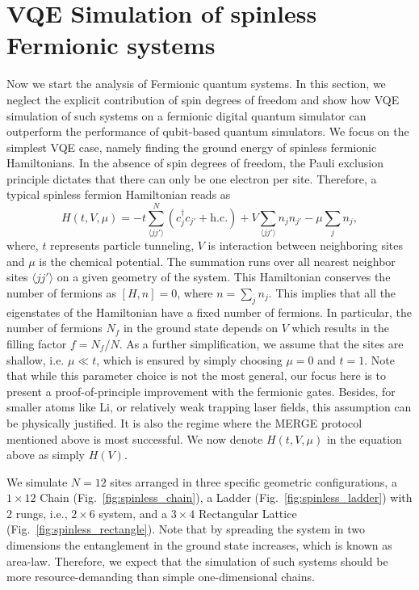 \documentclass[aps, prx, reprint, superscriptaddress]{revtex4-2}
\begin{document}
\section{VQE Simulation of spinless Fermionic systems}
\label{sec:III}
Now we start the analysis of Fermionic quantum systems. In this section, we neglect the explicit contribution of spin degrees of freedom and show how VQE simulation of such systems on a fermionic digital quantum simulator can outperform 
the performance of qubit-based quantum simulators. We focus on the simplest VQE case, namely finding the ground energy of spinless fermionic Hamiltonians. In the absence of spin degrees of freedom, the Pauli exclusion principle dictates that there can only be one electron per site. Therefore, a typical spinless fermion Hamiltonian reads as
\begin{equation}
    H(t,V,\mu)=-t\sum_{\langle jj'\rangle}^{N}(c_j^\dagger c_{j'} +\text{h.c.})+V\sum_{\langle jj'\rangle}n_jn_{j'}-\mu\sum_jn_j,
\label{eq:hubbard_spinless}
\end{equation}
where, $t$ represents particle tunneling, $V$ is interaction between neighboring sites and $\mu$ is the chemical potential. The summation runs over all nearest neighbor sites $\langle jj'\rangle$ on a given geometry of the system. 
This Hamiltonian conserves the number of fermions as $[H,n]{=}0$, where $n{=}\sum_j n_j$. 
This implies that all the eigenstates of the Hamiltonian have a fixed number of fermions. In particular, the number of fermions $N_f$ in the ground state depends on $V$ which results in the filling factor $f{=}N_f/N$. 
As a further simplification, we assume that the sites are shallow, i.e. $\mu \ll t$, which is ensured by simply choosing $\mu {=} 0$ and $t {=} 1$. Note that while this parameter choice is not the most general, our focus here is to present a proof-of-principle improvement with the fermionic gates. Besides, for smaller atoms like Li, or relatively weak trapping laser fields, this assumption can be physically justified. It is also the regime where the MERGE protocol mentioned above is most successful. We now denote $H(t,V,\mu)$ in the equation above as simply $H(V)$. 

We simulate $N {=} 12$ sites arranged in three specific geometric configurations, a $1{\times}12$ Chain (Fig.~\ref{fig:spinless_chain}), a Ladder (Fig.~\ref{fig:spinless_ladder}) with $2$ rungs, i.e., $2{\times} 6$ system, and a $3{\times} 4$ Rectangular Lattice (Fig.~\ref{fig:spinless_rectangle}).  
Note that by spreading the system in two dimensions the entanglement in the ground state increases, which is known as area-law. Therefore, we expect that the simulation of such systems should be more resource-demanding than simple one-dimensional chains.  
\end{document}
